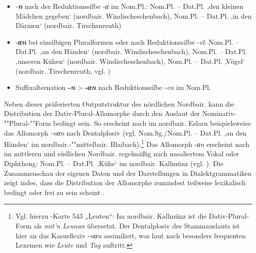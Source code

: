 \begin{itemize}
\item {}-\textbf{\textit{n}} nach der Reduktionssilbe -\textit{α} im Nom.Pl.: Nom.Pl.  -- Dat.Pl.     ‚den kleinen Mädchen gegeben‘ (nordbair. Windischeschenbach), Nom.Pl.  -- Dat.Pl.   ‚in den Därmen‘ (nordbair. Tirschenreuth)
\item {}-\textbf{\textit{αn}} bei einsilbigen Pluralformen oder nach Reduktionssilbe -\textit{el}: Nom.Pl.  -- Dat.Pl.   ‚an den Händen‘ (nordbair. Windischeschenbach), Nom.Pl.  -- Dat.Pl.   ‚unseren Kühen‘ (nordbair. Windischeschenbach), Nom.Pl.  -- Dat.Pl.  ‚Vögel‘ (nordbair. Tirschenreuth, vgl. \citealt[142]{Rowley1997})
\item Suffixalternation \textbf{{}-}\textbf{\textit{n}} > \textbf{-\textit{αn}} nach Reduktionssilbe -\textit{en} im Nom.Pl.
\end{itemize}

Neben dieser präferierten Outputstruktur des nördlichen Nordbair. kann die Distribution der Dativ-Plural-Allomorphe durch den Auslaut der No\-mi\-na\-tiv-""Plu\-ral-""Form bedingt sein. So erscheint nach \citet[87]{Bachmann2000} im nordbair. Eslarn beispielsweise das Allomorph {}-\textit{nαn} nach Dentalplosiv (vgl. Nom.Sg./Nom.Pl.  -- Dat.Pl.   ‚an den Händen‘ im nord\-bair.-""mit\-tel\-bair. Blaibach).\footnote{Vgl. hierzu \citealt{WA}-Karte 543 „Leuten“: Im nordbair. Kallmünz ist die Dativ-Plural-Form als \textit{mit’n Leunan} übersetzt. Der Dentalplosiv des Stammauslauts ist hier an das Kasusflexiv -\textit{nαn} assimiliert, was laut \citet[143]{Rowley1997} nach besonders frequenten Lexemen wie \textit{Leute} und \textit{Tag} auftritt.} Das Allomorph -\textit{αn} erscheint nach \citet[141]{Rowley1997} im mittleren und südlichen Nordbair. regelmäßig nach nasaliertem Vokal oder Diphthong: Nom.Pl.  -- Dat.Pl.   ‚Kühe‘ im nordbair. Kallmünz (vgl. \citealt[§147]{Kollmer1987}). Die Zusammenschau der eigenen Daten und der Darstellungen in Dialektgrammatiken zeigt indes, dass die Distribution der Allomorphe zumindest teilweise lexikalisch bedingt oder frei zu sein scheint \citep[142]{Rowley1997}.

